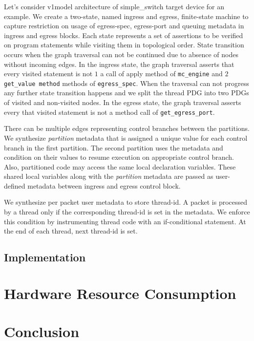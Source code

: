 \documentclass[letterpaper,twocolumn,10pt]{article}
\begin{document}
Let's consider v1model architecture of simple\_switch target device for an example.
We create a two-state, named ingress and egress, finite-state machine to capture restriction on usage of egress-spec, egress-port and queuing metadata in ingress and egress blocks.
Each state represents a set of assertions to be verified on program statements while visiting them in topological order.
State transition occurs when the graph traversal can not be continued due to absence of nodes without incoming edges.
In the ingress state, the graph traversal asserts that every visited statement is not $1$ a call of apply method of \texttt{mc\_engine}  and $2$ \texttt{get\_value method} methods of \texttt{egress\_spec}.
When the traversal can not progress any further state transition happens and we split the thread PDG into two PDGs of visited and non-visited nodes.
In the egress state, the graph traversal asserts every that visited statement is not a method call of \texttt{get\_egress\_port}.

There can be multiple edges representing control branches between the partitions.
We synthesize \emph{partition} metadata that is assigned a unique value for each control branch in the first partition.
The second partition uses the metadata and condition on their values to resume execution on appropriate control branch.
Also, partitioned code may access the same local declaration variables.
These shared local variables along with the \emph{partition} metadata are passed as user-defined metadata between ingress and egress control block.

We synthesize per packet user metadata to store thread-id.
A packet is processed by a thread only if the corresponding thread-id is set in the metadata. 
We enforce this condition by instrumenting thread code with an if-conditional statement.
At the end of each thread, next thread-id is set.


\subsection{Implementation}

\section{Hardware Resource Consumption}

\section{Conclusion}
\end{document}
